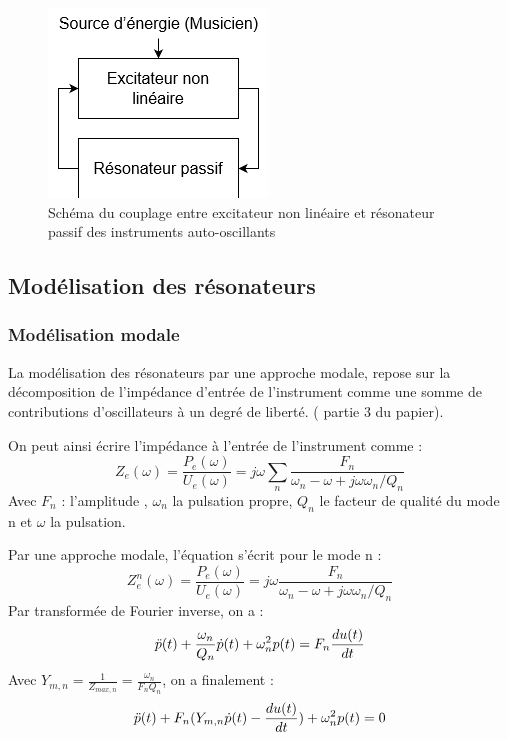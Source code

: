 \documentclass[atiam, article]{rapport} %
\begin{document}
\begin{figure}[b]
    \centering
    \includegraphics[scale=1.2]{report/Images/BouclageInstrumensNL.png}
    \caption{Schéma du couplage entre excitateur non linéaire et résonateur passif des instruments auto-oscillants}
    \label{fig:nl}
\end{figure}


\subsection{Modélisation des résonateurs}
\subsubsection{Modélisation modale}
La modélisation des résonateurs par une approche modale, repose sur la décomposition de l'impédance d'entrée de l'instrument comme une somme de contributions d'oscillateurs à un degré de liberté. (\cite{missoum_explicit_2014} partie 3 du papier). 

On peut ainsi écrire l'impédance à l'entrée de l'instrument comme : 
\begin{equation}
    Z_e(\omega) = \frac{P_e(\omega)}{U_e(\omega)} = j\omega\sum_{n}\frac{F_n}{\omega_n-\omega+j\omega\omega_n/Q_n}
\end{equation}
Avec $F_n$ : l'amplitude , $\omega_n$ la pulsation propre, $Q_n$ le facteur de qualité du mode n et $\omega$ la pulsation. 

Par une approche modale, l'équation s'écrit pour le mode n : 
\begin{equation}
    Z_e^{n}(\omega) = \frac{P_e(\omega)}{U_e(\omega)}= j\omega\frac{F_n}{\omega_n-\omega+j\omega\omega_n/Q_n}
\end{equation}
Par transformée de Fourier inverse, on a : 
\begin{equation}
    \Ddot{p}(t)+ \frac{\omega_n}{Q_n}\Dot{p}(t)+\omega_n^2p(t) = F_n\frac{du(t)}{dt}
\end{equation}
Avec $Y_{m,n} = \frac{1}{Z_{max,n}} = \frac{\omega_n}{F_n Q_n}$, on a finalement : 
\begin{equation}\label{eq:model_modal}
    \Ddot{p}(t)+ F_n(Y_{m,n}\Dot{p}(t)-\frac{du(t)}{dt})+\omega_n^2p(t) = 0
\end{equation}
\end{document}
